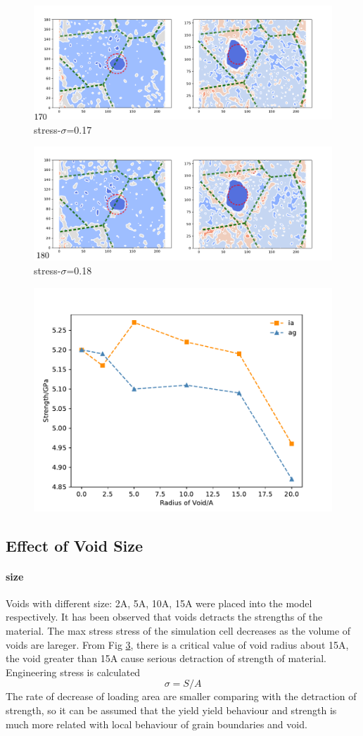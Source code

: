 \documentclass[times]{elsarticle}
\begin{document}
\begin{figure}
	\centering
	\includegraphics[width=0.7\linewidth]{img/frame170}
	\caption{stress-$\sigma$=0.17}
	\label{fig:all_line}
\end{figure}


\begin{figure}
	\centering
	\includegraphics[width=0.7\linewidth]{img/frame180}
	\caption{stress-$\sigma$=0.18}
	\label{fig:all_line}
\end{figure}

\begin{figure}
	\centering
 	\includegraphics[width=0.7\linewidth]{img/effect_of_vol}
	\caption{}
	\label{fig:voleff}
\end{figure}

\subsection{Effect of Void Size}
\paragraph{size}
Voids with different size: 2A, 5A, 10A, 15A were placed into the model respectively. It has been observed that  voids detracts the strengths of the material. The max stress stress of the simulation cell decreases as the volume of voids are lareger. From Fig \ref{fig:voleff}, there is a critical value of void radius about 15A, the void greater than 15A cause serious detraction of strength of material. 
Engineering stress is calculated
$$ \sigma = S/A$$
The rate of decrease of loading area are smaller comparing with the detraction of strength, so it can be assumed that the yield yield behaviour and strength is much more related with local behaviour of grain boundaries and void.
\end{document}
